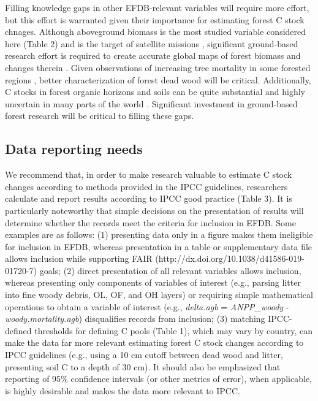 \documentclass[, manuscript]{copernicus}
\begin{document}
Filling knowledge gaps in other EFDB-relevant variables will require
more effort, but this effort is warranted given their importance for
estimating forest C stock chnages. Although aboveground biomass is the
most studied variable considered here (Table 2) and is the target of
satellite missions
\citep{dubayah_global_2020, quegan_european_2019, nisar_nasaisro_2018},
significant ground-based research effort is required to create accurate
global maps of forest biomass and changes therein
\citep{duncanson_importance_2019, labrière_forest_2023}. Given
observations of increasing tree mortality in some forested regions
\citep{mcdowell_pervasive_2020}, better characterization of forest dead
wood will be critical. Additionally, C stocks in forest organic horizons
and soils can be quite substantial and highly uncertain in many parts of
the world \citep{tifafi_large_2018}. Significant investment in
ground-based forest research will be critical to filling these gaps.

\subsection{Data reporting needs}

We recommend that, in order to make research valuable to estimate C
stock changes according to methods provided in the IPCC guidelines,
researchers calculate and report results according to IPCC good practice
(Table 3). It is particularly noteworthy that simple decisions on the
presentation of results will determine whether the records meet the
criteria for inclusion in EFDB. Some examples are as follows: (1)
presenting data only in a figure makes them ineligible for inclusion in
EFDB, whereas presentation in a table or supplementary data file allows
inclusion while supporting FAIR
(http://dx.doi.org/10.1038/d41586-019-01720-7) goals; (2) direct
presentation of all relevant variables allows inclusion, whereas
presenting only components of variables of interest (e.g., parsing
litter into fine woody debris, OL, OF, and OH layers) or requiring
simple mathematical operations to obtain a variable of interest (e.g.,
\emph{delta.agb} = \emph{ANPP\_woody} - \emph{woody.mortality.agb})
disqualifies records from inclusion; (3) matching IPCC-defined
thresholds for defining C pools (Table 1), which may vary by country,
can make the data far more relevant estimating forest C stock changes
according to IPCC guidelines (e.g., using a 10 cm cutoff between dead
wood and litter, presenting soil C to a depth of 30 cm). It should also
be emphasized that reporting of 95\% confidence intervals (or other
metrics of error), when applicable, is highly desirable and makes the
data more relevant to IPCC.
\end{document}
